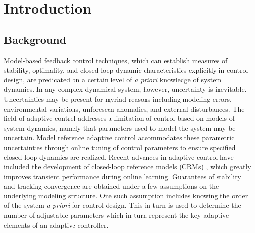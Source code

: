\chapter{Introduction} \label{ch:introduction}
\section{Background}
Model-based feedback control techniques, which can establish measures of stability, optimality, and closed-loop dynamic characteristics explicitly in control design, are predicated on a certain level of \textit{a priori} knowledge of system dynamics. In any complex dynamical system, however, uncertainty is inevitable. Uncertainties may be present for myriad reasons including modeling errors, environmental variations, unforeseen anomalies, and external disturbances. The field of adaptive control addresses a limitation of control based on models of system dynamics, namely that parameters used to model the system may be uncertain. Model reference adaptive control \cite{narendra2012stable, lavretsky2013robust} accommodates these parametric uncertainties through online tuning of control parameters to ensure specified closed-loop dynamics are realized. Recent advances in adaptive control have included the development of closed-loop reference models (CRMs) \cite{gibson2013adaptive}, which greatly improves transient performance during online learning. Guarantees of stability and tracking convergence are obtained under a few assumptions on the underlying modeling structure. One such assumption includes knowing the order of the system \textit{a priori} for control design. This in turn is used to determine the number of adjustable parameters which in turn represent the key adaptive elements of an adaptive controller.


